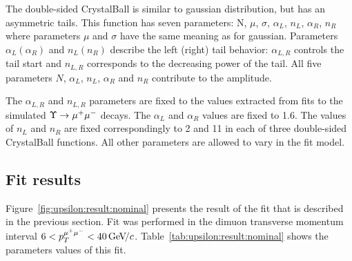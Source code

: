 The double-sided CrystalBall is similar to gaussian
distribution, but has an asymmetric tails. This function has seven parameters:
N, $\mu$, $\sigma$, $\alpha_L$, $n_L$, $\alpha_R$, $n_R$ where parameters $\mu$
and $\sigma$ have the same meaning as for gaussian. Parameters $\alpha_L
(\alpha_R)$ and $n_L (n_R)$ describe the left (right) tail behavior:
$\alpha_{L,R}$ controls the tail start and $n_{L,R}$ corresponds to the
decreasing power of the tail. All five parameters $N$, $\alpha_L$, $n_L$,
$\alpha_R$ and $n_R$ contribute to the amplitude.



The  $\alpha_{L,R}$ and $n_{L,R}$ parameters are fixed to the values extracted
from fits to the simulated $\Upsilon \rightarrow {\ensuremath{\mu^+\mu^-}}$ decays. The $\alpha_L$ and
$\alpha_R$ values are fixed to 1.6. The values of $n_L$  and $n_R$ are fixed
correspondingly to 2 and 11 in each of three double-sided CrystalBall
functions. All other parameters are allowed to vary in the fit model.

\subsection{Fit results}
\label{sec:upsilon:result}

Figure~\ref{fig:upsilon:result:nominal} presents the result of the fit that is
described in the previous section. Fit was performed in the dimuon
transverse momentum interval $ 6 < p_T^{{\mu^+\mu^-}} < 40 {\mathrm{\,Ge\kern -0.1em V\!/}c}$.
Table~\ref{tab:upsilon:result:nominal} shows the parameters values of this fit.







